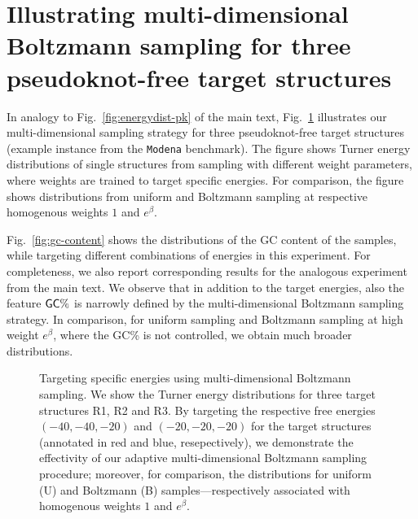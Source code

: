 \documentclass[10pt]{article}
\makeatletter
\newlength{\@aligneps}
\newcommand{\includegraphicstop}[2][]{%
\sbox{\@alignepsbox}{\texttt{[image: \#2]}}%
\setlength{\@aligneps}{-\ht\@alignepsbox}%
\addtolength{\@aligneps}{2ex}%
\raisebox{\@aligneps}{\usebox{\@alignepsbox}}}
\newcommand{\Nuc}[1]{{\sf #1}}
\newcommand{\Cb}{\Nuc{C}}
\newcommand{\Gb}{\Nuc{G}}
\newcommand{\GCb}{\Gb\Cb}
\makeatother
\begin{document}
    \section{Illustrating multi-dimensional Boltzmann sampling for three pseudoknot-free target structures}

    In analogy to Fig.~\ref{fig:energydist-pk} of the main text,
    Fig.~\ref{fig:energydist} illustrates our multi-dimensional sampling
    strategy for three pseudoknot-free target structures (example instance
    from the \texttt{Modena} benchmark). The figure shows Turner energy
    distributions of single structures from sampling with different weight
    parameters, where weights are trained to target specific energies. For
    comparison, the figure shows distributions from uniform and Boltzmann
    sampling at respective homogenous weights $1$ and $e^\beta$.

    Fig.~\ref{fig:gc-content} shows the distributions of the GC content of the samples, while targeting different combinations of energies in this experiment. For completeness, we also report corresponding results for the analogous experiment from the main text. We observe that in addition to the target energies, also the feature $\GCb\%$ is narrowly defined by the multi-dimensional Boltzmann sampling strategy. In comparison, for uniform sampling and Boltzmann sampling at high weight $e^\beta$, where the \GCb\% is not controlled, we obtain much broader distributions. 

    \begin{figure}[t]
      \begin{center}
        \includegraphicstop[width=0.8\textwidth]{Figs/energy_distribution}
      \end{center}
      \caption{%
        Targeting specific energies using multi-dimensional Boltzmann
        sampling. We show the Turner energy distributions for
        three target structures R1, R2 and R3. By
        targeting the respective free energies $(-40,-40,-20)$ and
        $(-20,-20,-20)$ for the target structures (annotated in red and
        blue, resepectively), we demonstrate the
        effectivity of our adaptive multi-dimensional Boltzmann sampling
        procedure; moreover, for comparison, the distributions for uniform
        (U) and Boltzmann (B) samples---respectively associated with
        homogenous weights $1$ and $e^\beta$.
  }
  \label{fig:energydist}
\end{figure}
\end{document}
